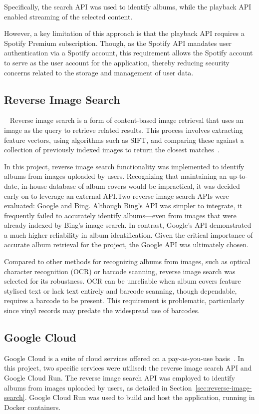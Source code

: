 Specifically, the search API was used to identify albums, while the playback API enabled streaming of the selected content.

However, a key limitation of this approach is that the playback API requires a Spotify Premium subscription. Though, as the Spotify API mandates user authentication via a Spotify account, this requirement allows the Spotify account to serve as the user account for the application, thereby reducing security concerns related to the storage and management of user data.

\subsection{Reverse Image Search}~\label{sec:reverse-image-search}
Reverse image search is a form of content-based image retrieval that uses an image as the query to retrieve related results. This process involves extracting feature vectors, using algorithms such as SIFT, and comparing these against a collection of previously indexed images to return the closest matches~\cite{Gaillard2017LargeSR}.

In this project, reverse image search functionality was implemented to identify albums from images uploaded by users. Recognizing that maintaining an up-to-date, in-house database of album covers would be impractical, it was decided early on to leverage an external API.\@ Two reverse image search APIs were evaluated: Google and Bing. Although Bing's API was simpler to integrate, it frequently failed to accurately identify albums—even from images that were already indexed by Bing's image search. In contrast, Google's API demonstrated a much higher reliability in album identification. Given the critical importance of accurate album retrieval for the project, the Google API was ultimately chosen.

Compared to other methods for recognizing albums from images, such as optical character recognition (OCR) or barcode scanning, reverse image search was selected for its robustness. OCR can be unreliable when album covers feature stylised text or lack text entirely and barcode scanning, though dependable, requires a barcode to be present. This requirement is problematic, particularly since vinyl records may predate the widespread use of barcodes.

\subsection{Google Cloud}
Google Cloud is a suite of cloud services offered on a pay-as-you-use basis~\cite{GCP}. In this project, two specific services were utilised: the reverse image search API and Google Cloud Run. The reverse image search API was employed to identify albums from images uploaded by users, as detailed in Section~\ref{sec:reverse-image-search}. Google Cloud Run was used to build and host the application, running in Docker containers.

